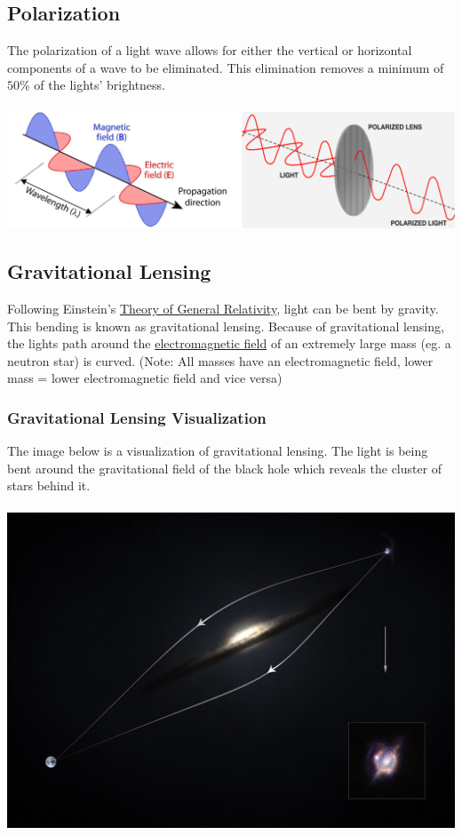 \documentclass{article}
\begin{document}
\subsection{Polarization}
The polarization of a light wave allows for either the vertical or horizontal components of a wave to be eliminated. This elimination removes a minimum of $50\%$ of the lights' brightness.\\\\
\includegraphics[scale=0.45]{images/polarization.png}
\subsection{Gravitational Lensing}\label{sec:gravitational_lensing}
Following Einstein's \hyperref[sec:generalrelativity]{Theory of General Relativity}, light can be bent by gravity. This bending is known as gravitational lensing. Because of gravitational lensing, the lights path around the \hyperref[sec:electromagneticfields]{electromagnetic field} of an extremely large mass (eg. a neutron star) is curved. (Note: All masses have an electromagnetic field, lower mass = lower electromagnetic field and vice versa)

\subsubsection{Gravitational Lensing Visualization}
The image below is a visualization of gravitational lensing. The light is being bent around the gravitational field of the black hole which reveals the cluster of stars behind it.\\\\
\includegraphics[scale=0.2]{images/grav_lensing.png}
\end{document}
